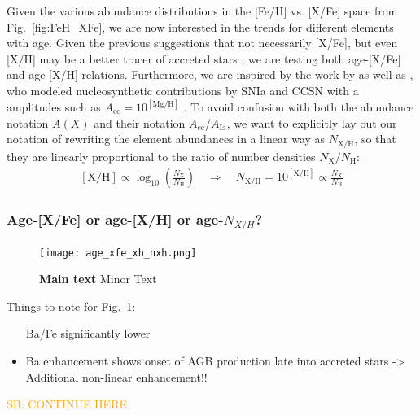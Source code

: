 \documentclass[fleqn,usenatbib]{mnras}
\newcommand{\SB}[1]{{\textcolor{orange}{SB: #1}}}
\begin{document}
Given the various abundance distributions in the [Fe/H] vs. [X/Fe] space from Fig.~\ref{fig:FeH_XFe}, we are now interested in the trends for different elements with age. Given the previous suggestions that not necessarily [X/Fe], but even [X/H] may be a better tracer of accreted stars \citep[e.g.][for [Mg/H]{Fuhrmann2017, Feuillet2021}, we are testing both age-[X/Fe] and age-[X/H] relations. Furthermore, we are inspired by the work by \citet{Weinberg2019, Weinberg2021} as well as \cite{Griffith2019, Griffith2022}, who modeled nucleosynthetic contributions by SNIa and CCSN with a amplitudes such as $A_\text{cc} = 10^\mathrm{[Mg/H]}$ \citep{Weinberg2019}. To avoid confusion with both the abundance notation $A(X)$ and their notation $A_\mathrm{cc}$/$A_\mathrm{Ia}$, we want to explicitly lay out our notation of rewriting the element abundances in a linear way as $N_\text{X/H}$, so that they are linearly proportional to the ratio of number densities $N_\text{X}/N_\text{H}$:
\begin{align}
    \left[\text{X/H}\right] \varpropto \log_{10}\left(\frac{N_\text{X}}{N_\text{H}}\right) \quad \Rightarrow \quad N_\text{X/H} = 10^{\mathrm{[X/H]}} \varpropto \frac{N_\text{X}}{N_\text{H}}
\end{align}

\subsubsection{Age-[X/Fe] or age-[X/H] or age-$N_{X/H}$?}

\begin{figure}
	\texttt{[image: age\_xfe\_xh\_nxh.png]}
    \caption{
    \textbf{Main text
    } Minor Text
    }
    \label{fig:age_xfe_xh_nxh}
\end{figure}

Things to note for Fig.~\ref{fig:age_xfe_xh_nxh}:
\begin{itemize}
    \item [Ba/Fe] significantly lower 
    \item Ba enhancement shows onset of AGB production late into accreted stars -> Additional non-linear enhancement!!
\end{itemize}

\SB{CONTINUE HERE} \\ $\,$
\end{document}
